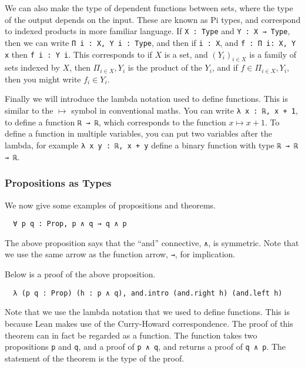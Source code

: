 \documentclass[12pt]{article} %
\theoremstyle{definition}
\theoremstyle{definition}
\theoremstyle{definition}
\theoremstyle{definition}
\theoremstyle{definition}
\theoremstyle{definition}
\begin{document}
We can also make the type of dependent functions between sets,
where the type of the output depends on the input. These are known as Pi types, and correspond
to indexed products in more familiar language.
If \lstinline{X : Type} and \lstinline{Y : X → Type}, then we can write
\lstinline{Π i : X, Y i : Type}, and then if \lstinline{i : X},
and \lstinline{f : Π i: X, Y x} then \lstinline{f i : Y i}.
This corresponds to if $X$ is a set,
and $(Y_i)_{i \in X}$ is a family of sets indexed by $X$, then
$\Pi_{i \in X}, Y_i$ is the product of the $Y_i$, and if
$f \in \Pi_{i \in X}, Y_i$, then you might write $f_i \in Y_i$.

Finally we will introduce the lambda notation used to define functions. This
is similar to the $\mapsto$ symbol in conventional maths. You can write
\lstinline{λ x : ℝ, x + 1}, to define a function \lstinline{ℝ → ℝ},
which corresponds to the function $x \mapsto x + 1$. To define a function
in multiple variables, you can put two variables after the lambda, for example
\lstinline{λ x y : ℝ, x + y} define a binary function with type \lstinline{ℝ → ℝ → ℝ}.

\subsubsection{Propositions as Types}

We now give some examples of propositions and theorems.

\begin{lstlisting}
  ∀ p q : Prop, p ∧ q → q ∧ p
\end{lstlisting}

The above proposition says that the ``and'' connective, \lstinline{∧}, is symmetric. Note that
we use the same arrow as the function arrow, \lstinline{→}, for implication.

Below is a proof of the above proposition.
\begin{lstlisting}
  λ (p q : Prop) (h : p ∧ q), and.intro (and.right h) (and.left h)
\end{lstlisting}

Note that we use the lambda notation that we used to define functions. This is because Lean
makes use of the Curry-Howard correspondence. The proof of this theorem can in fact be
regarded as a function. The function takes two propositions \lstinline{p} and \lstinline{q},
and a proof of \lstinline{p ∧ q}, and returns a proof of \lstinline{q ∧ p}. The
statement of the theorem is the type of the proof.
\end{document}
